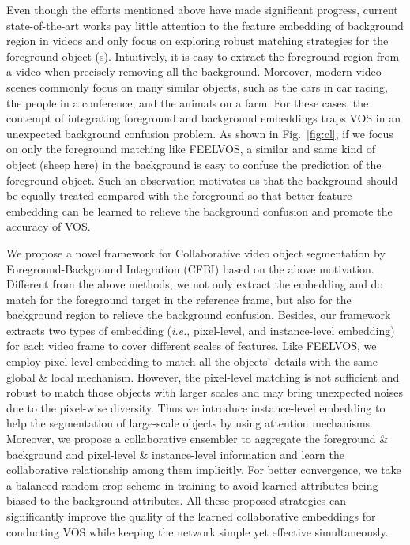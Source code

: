 \documentclass[runningheads]{llncs}
\def\ie{\emph{i.e.}}
\newcommand{\zongxin}[1]{#1}
\begin{document}
Even though the efforts mentioned above have made significant progress, current state-of-the-art works pay little attention to the feature embedding of background region in videos and only focus on exploring robust matching strategies for the foreground object (s). Intuitively, it is easy to extract the foreground region from a video when precisely removing all the background. Moreover, modern video scenes commonly focus on many similar objects, such as the cars in car racing, the people in a conference, and the animals on a farm. For these cases, the contempt of integrating foreground and background embeddings traps VOS in an unexpected background confusion problem. As shown in Fig.~\ref{fig:cl}, if we focus on only the foreground matching like FEELVOS, a similar and same kind of object (sheep here) in the background is easy to confuse the prediction of the foreground object. Such an observation motivates us that the background should be equally treated compared with the foreground so that better feature embedding can be learned to relieve the background confusion and promote the accuracy of VOS.



We propose a novel framework for Collaborative video object segmentation by Foreground-Background Integration (CFBI) based on the above motivation. 
Different from the above methods, we not only extract the embedding and do match for the foreground target in the reference frame, but also for the background region to relieve the background confusion.
Besides, our framework extracts two types of embedding (\ie, pixel-level, and instance-level embedding) for each video frame to cover different scales of features. Like FEELVOS, we employ pixel-level embedding to match all the objects' details with the same global \& local mechanism. However, the pixel-level matching is not sufficient and robust to match those objects with larger scales and may bring unexpected noises due to the pixel-wise diversity. Thus we introduce instance-level embedding to help the segmentation of large-scale objects by using attention mechanisms.
Moreover, we propose a collaborative ensembler to aggregate the foreground \& background and pixel-level \& instance-level information and learn the collaborative relationship among them implicitly.
\zongxin{For better convergence, we take a balanced random-crop scheme in training to avoid learned attributes being biased to the background attributes.}
All these proposed strategies can significantly improve the quality of the learned collaborative embeddings for conducting VOS while keeping the network simple yet effective simultaneously.
\end{document}
